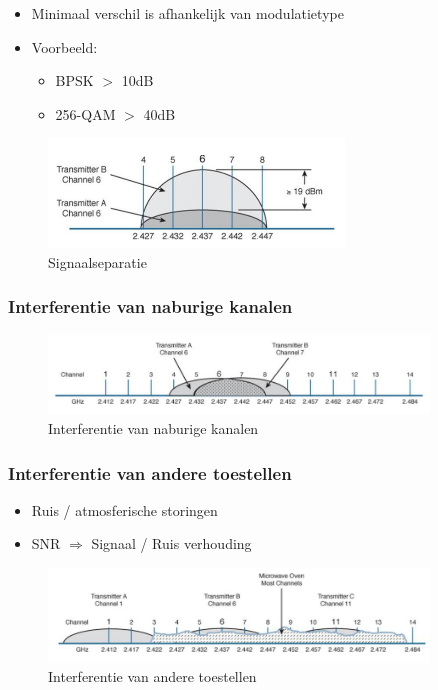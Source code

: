 \documentclass{article}
\begin{document}
\begin{itemize}
    \item Minimaal verschil is afhankelijk van modulatietype
    \item Voorbeeld:
    \begin{itemize}
        \item BPSK $>$ 10dB
        \item 256-QAM $>$ 40dB
    \end{itemize}
\end{itemize}

\begin{figure}[H]
    \centering
    \includegraphics[width=0.7\textwidth]{Screenshot_20200309_120012.png}
    \caption{Signaalseparatie}
\end{figure}

\subsubsection{Interferentie van naburige kanalen}
\begin{figure}[H]
    \centering
    \includegraphics[width=0.9\textwidth]{Screenshot_20200309_120313.png}
    \caption{Interferentie van naburige kanalen}
\end{figure}

\subsubsection{Interferentie van andere toestellen}
\begin{itemize}
    \item Ruis / atmosferische storingen
    \item SNR $\Rightarrow$ Signaal / Ruis verhouding
\end{itemize}

\begin{figure}[H]
    \centering
    \includegraphics[width=0.9\textwidth]{Screenshot_20200309_120624.png}
    \caption{Interferentie van andere toestellen}
\end{figure}
\end{document}
